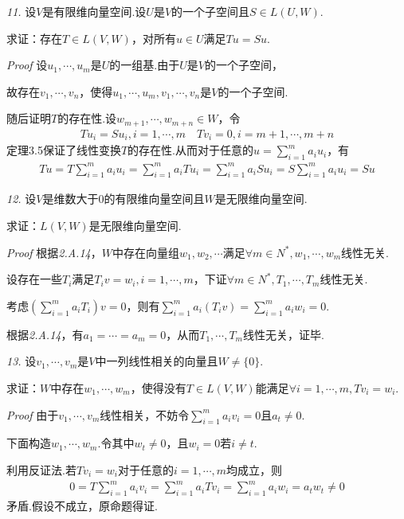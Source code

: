\textit{11.}
设\(V\)是有限维向量空间.设\(U\)是\(V\)的一个子空间且\(S\in L(U,W)\).

求证：存在\(T\in L(V,W)\)，对所有\(u\in U\)满足\(Tu=Su\).

\textit{Proof}
设\(u_1,\cdots,u_m\)是\(U\)的一组基.由于\(U\)是\(V\)的一个子空间，

故存在\(v_1,\cdots,v_n\)，使得\(u_1,\cdots,u_m,v_1,\cdots,v_n\)是\(V\)的一个子空间.

随后证明\(T\)的存在性.设\(w_{m+1},\cdots,w_{m+n} \in W\)，令
    \begin{align*}
        Tu_i=Su_i,i=1,\cdots,m \quad Tv_i=0,i=m+1,\cdots,m+n
    \end{align*}
定理3.5保证了线性变换\(T\)的存在性.从而对于任意的\(u=\sum_{i=1}^m a_iu_i\)，有
    \begin{align*}
        Tu=T\sum_{i=1}^m a_iu_i=\sum_{i=1}^m a_iTu_i=\sum_{i=1}^m a_iSu_i=S\sum_{i=1}^m a_iu_i=Su
    \end{align*}

\hspace*{\fill}

\textit{12.}
设\(V\)是维数大于0的有限维向量空间且\(W\)是无限维向量空间.

求证：\(L(V,W)\)是无限维向量空间.

\textit{Proof}
根据\textit{2.A.14}，\(W\)中存在向量组\(w_1,w_2,\cdots\)满足\(\forall m \in N^*,w_1,\cdots,w_m\)线性无关.

设存在一些\(T_i\)满足\(T_iv=w_i,i=1,\cdots,m\)，下证\(\forall m \in N^*,T_1,\cdots,T_m\)线性无关.

考虑\((\sum_{i=1}^m a_iT_i)v=0\)，则有\(\sum_{i=1}^m a_i(T_iv)=\sum_{i=1}^m a_iw_i=0\).

根据\textit{2.A.14}，有\(a_1=\cdots=a_m=0\)，从而\(T_1,\cdots,T_m\)线性无关，证毕.

\hspace*{\fill}

\textit{13.}
设\(v_1,\cdots,v_m\)是\(V\)中一列线性相关的向量且\(W \ne \{0\}\).

求证：\(W\)中存在\(w_1,\cdots,w_m\)，使得没有\(T\in L(V,W)\)能满足\(\forall i=1,\cdots,m,Tv_i=w_i\).

\textit{Proof}
由于\(v_1,\cdots,v_m\)线性相关，不妨令\(\sum_{i=1}^m a_iv_i=0\)且\(a_t \ne 0\).

下面构造\(w_1,\cdots,w_m\).令其中\(w_t \ne 0\)，且\(w_i=0\)若\(i \ne t\).

利用反证法.若\(Tv_i=w_i\)对于任意的\(i=1,\cdots,m\)均成立，则
    \begin{align*}
        0=T\sum_{i=1}^m a_iv_i=\sum_{i=1}^m a_iTv_i=\sum_{i=1}^m a_iw_i=a_tw_t \ne 0
    \end{align*}
矛盾.假设不成立，原命题得证.